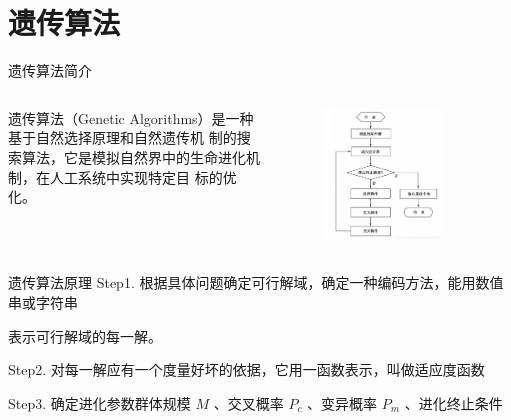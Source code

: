 \documentclass[xcolor=table,dvipsnames,svgnames,aspectratio=169,fontset=ubuntu]{ctexbeamer}
\let\\\relax
\let\quad\relax
\begin{document}
\section{遗传算法}
\begin{frame}{遗传算法简介}
  \begin{columns}
  遗传算法（Genetic Algorithms）是一种基于自然选择原理和自然遗传机
  制的搜索算法，它是模拟自然界中的生命进化机制，在人工系统中实现特定目
  标的优化。
  \begin{figure}
    \centering
    \includegraphics[width=0.8\textwidth]{遗传算法.png}
  \end{figure}
  \end{columns}
\end{frame}

\begin{frame}{遗传算法原理}
  Step1. 根据具体问题确定可行解域，确定一种编码方法，能用数值串或字符串\\
  
  \qquad\quad\; 表示可行解域的每一解。

  \vskip 15pt
  Step2. 对每一解应有一个度量好坏的依据，它用一函数表示，叫做适应度函数

  \vskip 15pt
  Step3. 确定进化参数群体规模 $M$ 、交叉概率 $P_c$ 、变异概率 $P_m$ 、进化终止条件
\end{frame}
\end{document}
